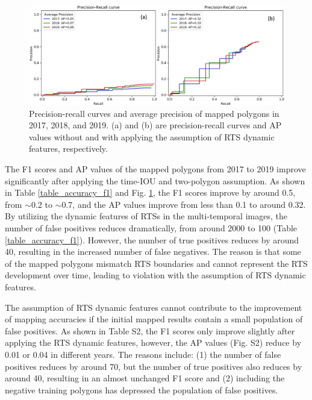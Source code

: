 \documentclass[authoryear,preprint,review,12pt]{elsarticle}
\begin{document}
\begin{figure}
	\centering
	\includegraphics[width=14cm]{figs/exp7_p_r_curves_trim.jpg}
	\caption{Precision-recall curves and average precision of mapped polygons in 2017, 2018, and 2019. (a) and (b) are precision-recall curves and AP values without and with applying the assumption of RTS dynamic features, respectively.}
	\label{fig_p_r_curve_exp7}
\end{figure}


The F1 scores and AP values of the mapped polygons from 2017 to 2019 improve significantly after applying the time-IOU and two-polygon assumption. 
As shown in Table \ref{table_accuracy_f1} and Fig. \ref{fig_p_r_curve_exp7}, the F1 scores improve by around 0.5, from $\sim$0.2 to $\sim$0.7, and the AP values improve from less than 0.1 to around 0.32. 
By utilizing the dynamic features of RTSs in the multi-temporal images, the number of false positives reduces dramatically, from around 2000 to 100 (Table \ref{table_accuracy_f1}).
However, the number of true positives reduces by around 40, resulting in the increased number of false negatives. 
The reason is that some of the mapped polygons mismatch RTS boundaries and cannot represent the RTS development over time, leading to violation with the assumption of RTS dynamic features. 
 
The assumption of RTS dynamic features cannot contribute to the improvement of mapping accuracies if the initial mapped results contain a small population of false positives. 
As shown in Table S2, the F1 scores only improve slightly after applying the RTS dynamic features, however, the AP values (Fig. S2) reduce by 0.01 or 0.04 in different years.   
The reasons include: (1) the number of false positives reduces by around 70, but the number of true positives also reduces by around 40, resulting in an almost unchanged F1 score 
and (2) including the negative training polygons %
 has depressed the population of false positives. 
\end{document}

